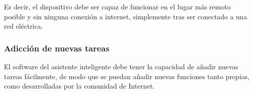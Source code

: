 Es decir, el dispositivo debe ser capaz de funcionar en el lugar más remoto posible y sin ninguna conexión a internet, simplemente tras ser conectado a una red eléctrica.

\subsubsection{Adicción de nuevas tareas}

El software del asistente inteligente debe tener la capacidad de añadir nuevas tareas fácilmente, de modo que se puedan añadir nuevas funciones tanto propias, como desarrolladas por la comunidad de Internet.
